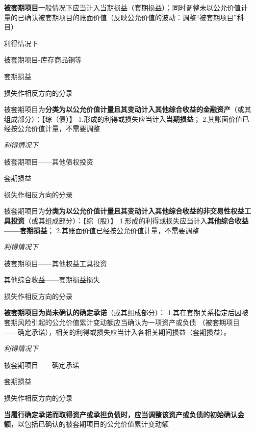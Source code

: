 \documentclass[UTF8,12pt]{ctexart}
\newenvironment{Dr}{%
	\begin{list}{}%
		{
			\setlength{\leftmargin}{2em}
			\setlength{\labelwidth}{2em}
			\setlength{\labelsep}{0pt}
			\setlength{\itemindent}{0pt}
			\setlength{\listparindent}{0pt}
			\setlength{\parsep}{0pt}
			\setlength{\topsep}{0pt}
		}
		\item[\textbf{借：}]
	}{%
	\end{list}
}
\newenvironment{Cr}{%
	\begin{list}{}%
		{
			\setlength{\leftmargin}{3em}
			\setlength{\labelwidth}{2em}
			\setlength{\labelsep}{0pt}
			\setlength{\itemindent}{0pt}
			\setlength{\listparindent}{0pt}
			\setlength{\parsep}{0pt}
			\setlength{\topsep}{0pt}
		}
		\item[\textbf{贷：}]
	}{%
	\end{list}
}
\numberwithin{equation}{section} %
\numberwithin{figure}{section}
\numberwithin{table}{section}
\begin{document}
	\textbf{被套期项目}一般情况下应当计入当期损益（套期损益）；同时调整未以公允价值计量的已确认被套期项目的账面价值（反映公允价值的波动：调整“被套期项目”科目）
	
	利得情况下
	
	\begin{Dr}
		被套期项目-库存商品铜等
	\end{Dr}
	\begin{Cr}
		套期损益
	\end{Cr}
	损失作相反方向的分录
	
	被套期项目为\textbf{分类为以公允价值计量且其变动计入其他综合收益的金融资产}（或其组成部分）：【综（债）】
	1.形成的利得或损失应当计入\textbf{当期损益}；
	2.其账面价值已经按公允价值计量，不需要调整
	
	\textit{利得情况下}
	
	\begin{Dr}
		被套期项目——其他债权投资
	\end{Dr}
	\begin{Cr}
		套期损益
	\end{Cr}
	损失作相反方向的分录
	
	被套期项目为\textbf{分类为以公允价值计量且其变动计入其他综合收益的非交易性权益工具投资}（或其组成部分）：【综（股）】
	1.形成的利得或损失应当计入\textbf{其他综合收益——套期损益}；
	2.其账面价值已经按公允价值计量，不需要调整
	
	\textit{利得情况下}
	
	\begin{Dr}
		被套期项目——其他权益工具投资
	\end{Dr}
	\begin{Cr}
		其他综合收益——套期损益损失
	\end{Cr}
	损失作相反方向的分录
	
	\textbf{被套期项目为尚未确认的确定承诺}（或其组成部分）：
	1.其在套期关系指定后因被套期风险引起的公允价值累计变动额应当确认为一项资产或负债
	（被套期项目——确定承诺），相关的利得或损失应当计入各相关期间损益（套期损益）。
	
	\textit{利得情况下}
	
	\begin{Dr}
		被套期项目——确定承诺
	\end{Dr}
	\begin{Cr}
		套期损益
	\end{Cr}
	损失作相反方向的分录
	
	\textbf{当履行确定承诺而取得资产或承担负债时，应当调整该资产或负债的初始确认金额}，以包括已确认的被套期项目的公允价值累计变动额
	
\end{document}
